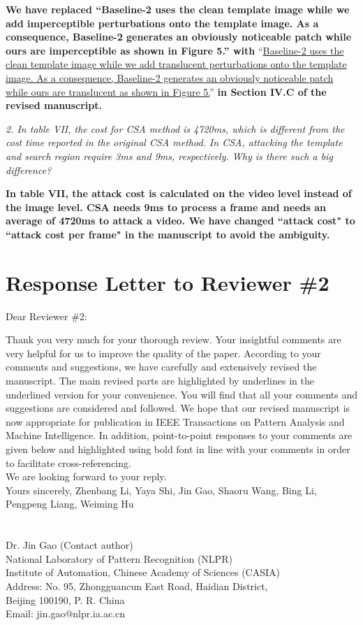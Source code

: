 \documentclass[12pt]{article}
\begin{document}
\textbf{We have replaced ``Baseline-2 uses the clean template image while we add imperceptible perturbations onto the template image. As a consequence, Baseline-2 generates an obviously noticeable patch while ours are imperceptible as shown in Figure 5.'' with} 
``\uline{Baseline-2 uses the clean template image while we add translucent perturbations onto the template image. As a consequence, Baseline-2 generates an obviously noticeable patch while ours are translucent as shown in Figure 5.}'' 
\textbf{in Section IV.C of the revised manuscript.}

\textit{2. In table VII, the cost for CSA method is 4720ms, which is different from the cost time reported in the original CSA method. In CSA, attacking the template and search region require 3ms and 9ms, respectively. Why is there such a big difference?}

\textbf{In table VII, the attack cost is calculated on the video level instead of the image level. CSA needs 9ms to process a frame and needs an average of 4720ms to attack a video. We have changed ``attack cost" to ``attack cost per frame" in the manuscript to avoid the ambiguity.}

\newpage
{\centering\section*{Response Letter to Reviewer \#2}}
\noindent Dear Reviewer \#2:

Thank you very much for your thorough review. Your insightful comments are very helpful for us to improve the quality of the paper. According to your comments and suggestions, we have carefully and extensively revised the manuscript. The main revised parts are highlighted by underlines in the underlined version for your convenience. You will find that all your comments and suggestions are considered and followed. We hope that our revised manuscript is now appropriate for publication in IEEE Transactions on Pattern Analysis and Machine Intelligence.
In addition, point-to-point responses to your comments are given below and highlighted using bold font in line with your comments in order to facilitate cross-referencing.\\[10pt]
\indent We are looking forward to your reply.\\[10pt]
\noindent Yours sincerely,
\noindent Zhenbang Li, Yaya Shi, Jin Gao, Shaoru Wang, Bing Li, Pengpeng Liang, Weiming Hu
\\
\\
\\
\noindent Dr. Jin Gao (Contact author)\\
\noindent National Laboratory of Pattern Recognition (NLPR)\\
\noindent Institute of Automation, Chinese Academy of Sciences (CASIA)\\
\noindent Address: No. 95, Zhongguancun East Road, Haidian District,\\
\noindent Beijing 100190, P. R. China\\
\noindent Email: jin.gao@nlpr.ia.ac.cn
\end{document}
